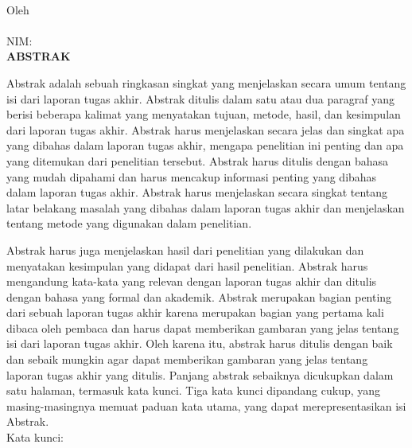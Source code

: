 
\clearpage
{}
{}
\begin{center}
    \textbf{\large{\judulid}}\\[0.5cm]
    Oleh\\
    \penulis\\
    NIM: \nim\\[2em]
    \textbf{ABSTRAK}\\[0.5cm]
\end{center}

Abstrak adalah sebuah ringkasan singkat yang menjelaskan secara umum tentang isi dari laporan tugas akhir. Abstrak ditulis dalam satu atau dua paragraf yang berisi beberapa kalimat yang menyatakan tujuan, metode, hasil, dan kesimpulan dari laporan tugas akhir. Abstrak harus menjelaskan secara jelas dan singkat apa yang dibahas dalam laporan tugas akhir, mengapa penelitian ini penting dan apa yang ditemukan dari penelitian tersebut. Abstrak harus ditulis dengan bahasa yang mudah dipahami dan harus mencakup informasi penting yang dibahas dalam laporan tugas akhir. Abstrak harus menjelaskan secara singkat tentang latar belakang masalah yang dibahas dalam laporan tugas akhir dan menjelaskan tentang metode yang digunakan dalam penelitian.

Abstrak harus juga menjelaskan hasil dari penelitian yang dilakukan dan menyatakan kesimpulan yang didapat dari hasil penelitian. Abstrak harus mengandung kata-kata yang relevan dengan laporan tugas akhir dan ditulis dengan bahasa yang formal dan akademik. Abstrak merupakan bagian penting dari sebuah laporan tugas akhir karena merupakan bagian yang pertama kali dibaca oleh pembaca dan harus dapat memberikan gambaran yang jelas tentang isi dari laporan tugas akhir. Oleh karena itu, abstrak harus ditulis dengan baik dan sebaik mungkin agar dapat memberikan gambaran yang jelas tentang laporan tugas akhir yang ditulis. Panjang abstrak sebaiknya dicukupkan dalam satu halaman, termasuk kata kunci. Tiga kata kunci dipandang cukup, yang masing-masingnya memuat paduan kata utama, yang dapat merepresentasikan isi Abstrak.\\[0.6cm]

\noindent Kata kunci: \katakunci